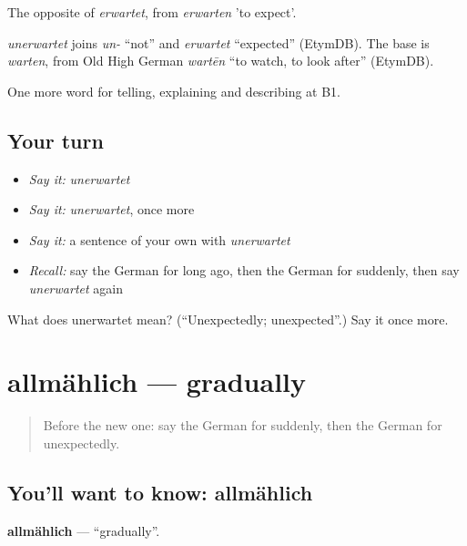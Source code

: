 The opposite of \emph{erwartet}, from \emph{erwarten} 'to expect'.

\begin{cousinweb}
\emph{unerwartet} joins \emph{un-} \textquotedblleft{}not\textquotedblright{} and \emph{erwartet} \textquotedblleft{}expected\textquotedblright{} (EtymDB). The base is \emph{warten}, from Old High German \emph{wartēn} \textquotedblleft{}to watch, to look after\textquotedblright{} (EtymDB).
\end{cousinweb}

\begin{grammarlens}[title={What you've built}]
One more word for telling, explaining and describing at B1.
\end{grammarlens}

\subsection*{Your turn}
\begin{itemize}
\raggedright
  \item \emph{Say it:} \emph{unerwartet}
  \item \emph{Say it:} \emph{unerwartet}, once more
  \item \emph{Say it:} a sentence of your own with \emph{unerwartet}
  \item \emph{Recall:} say the German for long ago, then the German for suddenly, then say \emph{unerwartet} again
\end{itemize}

\begin{tcolorbox}[breakable,colback=teal!4,colframe=teal!35!black,title={Before you move on}]
What does unerwartet mean? (\textquotedblleft{}Unexpectedly; unexpected\textquotedblright{}.) Say it once more.
\end{tcolorbox}
\section[allmählich]{allmählich — gradually}

\label{lesson:GE-C266-allmaehlich}



\begin{quote}
Before the new one: say the German for suddenly, then the German for unexpectedly.
\end{quote}

\subsection*{You'll want to know: allmählich}
\textbf{allmählich} — \textquotedblleft{}gradually\textquotedblright{}.

